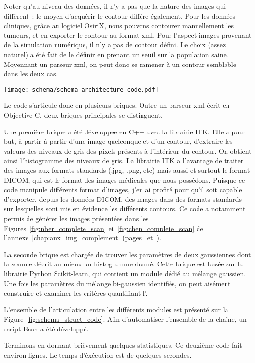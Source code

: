 \documentclass[main.tex]{subfiles}
\begin{document}
Noter qu'au niveau des données, il n'y a pas que la nature des images qui diffèrent~: le moyen d'acquérir le contour diffère également. 
Pour les données cliniques, grâce au logiciel OsiriX, nous pouvons contourer manuellement les tumeurs, et en exporter le contour au format xml. Pour l'aspect images provenant de la simulation numérique, il n'y a pas de contour défini. Le choix (assez naturel) a été fait de le définir en prenant un seuil sur la population saine. Moyennant un parseur xml, on peut donc se ramener à un contour semblable dans les deux cas.

\begin{sidewaysfigure}
\centering
\vfill
\texttt{[image: schema/schema\_architecture\_code.pdf]} %
\caption{\label{fig:schema_struct_code}Schéma du code de calcul permettant la quantification de l'\hetero. Le code est très hétéroclite et fait intervenir plusieurs langages de programmation}
\end{sidewaysfigure}


Le code s'articule donc en plusieurs briques. Outre un parseur xml écrit en Objective-C, deux briques principales se distinguent. 


Une première brique a été développée en C++ avec la librairie ITK. 
Elle a pour but, à partir à partir d'une image quelconque 
 et d'un contour, d'extraire les valeurs des niveaux de gris des pixels présents à l'intérieur du contour. On obtient ainsi l'histogramme des niveaux de gris. 
La librairie ITK a l'avantage de traiter des images aux formats standards (.jpg, .png, etc) mais aussi et surtout le format DICOM, qui est le format des images médicales que nous possédons. 
Puisque ce code manipule différents format d'images, j'en ai profité pour qu'il soit capable d'exporter, depuis les données DICOM, des images dans des formats standards sur lesquelles sont mis en évidence les différents contours. 
Ce code a notamment permis de générer les images présentées dans les Figures~\ref{fig:nber_complete_scan} et~\ref{fig:chen_complete_scan} de l'annexe~\ref{chap:anx_img_complement} (pages~\pageref{fig:nber_complete_scan} et~\pageref{fig:chen_complete_scan}).


La seconde brique est chargée de trouver les paramètres de deux gaussiennes dont la somme décrit au mieux un histogramme donné. 
Cette brique est basée sur la librairie Python Scikit-learn, qui contient un module dédié au mélange gaussien. Une fois les paramètres du mélange bi-gaussien identifiés, on peut aisément construire et examiner les critères quantifiant l'\hetero.

L'ensemble de l'articulation entre les différents modules est présenté sur la Figure~\ref{fig:schema_struct_code}.
Afin d'automatiser l'ensemble de la chaîne, un script Bash a été développé.


Terminons en donnant brièvement quelques statistiques. Ce deuxième code fait environ  lignes. Le temps d'éxécution est de quelques secondes.
 
\end{document}
